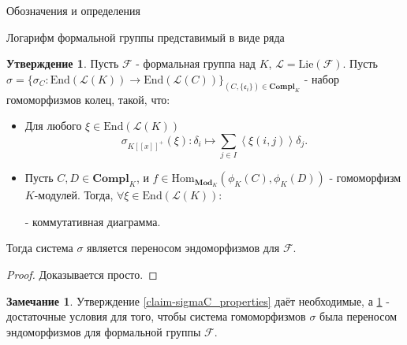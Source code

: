 \documentclass[a4paper,14pt]{extarticle}
\theoremstyle{definition}
\newtheorem{claim}[theorem]{Утверждение}
\newtheorem{remark}{Замечание}[section]
\newcommand{\End}[1]{\mathrm{End}\left(#1\right)}
\newcommand{\Compl}[1]{\mathbf{Compl}_{#1}}
\newcommand{\forget}[1]{\phi_{#1}}
\newcommand{\Lie}[1]{\mathrm{Lie}\left(#1\right)}
\newcommand{\Mod}[1]{\mathbf{Mod}_{#1}}
\newcommand{\fc}{\mathfrak{c}}
\newcommand{\oH}[1]{\left\langle #1 \right\rangle}
\newcommand{\sF}{\mathscr{F}}
\newcommand{\sL}{\mathscr{L}}
\begin{document}
\begin{section}{Обозначения и определения}
\begin{subsection}{Логарифм формальной группы представимый в виде ряда}
\begin{claim}\label{claim-sigmaC_sufficient}
    Пусть $\sF$ - формальная группа над $K$, ${ \sL = \Lie{\sF} }$. Пусть ${ \sigma = \{ \sigma_C : \End{\sL(K)} \rightarrow \End{\sL(C)} \}_{(C, \{\fc_i\}) \in \Compl{K}} }$ - набор гомоморфизмов колец, такой, что:
    \begin{itemize}
        \item Для любого ${ \xi \in \End{\sL(K)} }$
        \begin{equation*}
            \sigma_{K[[x]]^+}(\xi) :
            \delta_i \mapsto
            \sum_{j \in I} \oH{\xi(i, j)} \delta_j.
        \end{equation*}
        \item Пусть ${ C, D \in \Compl{K} }$, и ${ f \in \mathrm{Hom}_{\Mod{K}}(\forget{K}(C), \forget{K}(D)) }$ - гомоморфизм $K$-модулей. Тогда, ${ \forall \xi \in \End{\sL(K)} }$:
        \begin{center}
        \end{center}
        - коммутативная диаграмма.
    \end{itemize}
    Тогда система $\sigma$ является переносом эндоморфизмов для $\sF$.
\end{claim}
\begin{proof}
    Доказывается просто.
\end{proof}

\begin{remark}
   Утверждение \ref{claim-sigmaC_properties} даёт необходимые, а \ref{claim-sigmaC_sufficient} - достаточные условия для того, чтобы система гомоморфизмов $\sigma$ была переносом эндоморфизмов для формальной группы $\sF$.
\end{remark}


\end{subsection}
\end{section}
\end{document}
